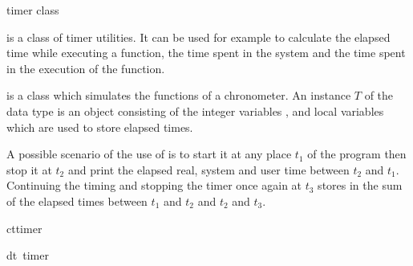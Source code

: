 

\NAME

 \dotfill timer class



\ABSTRACT

 is a class of timer utilities.  It can be used for
example to calculate the elapsed time while executing a function, the
time spent in the system and the time spent in the execution of the
function.


\DESCRIPTION

 is a class which simulates the functions of a
chronometer.  An instance $T$ of the data type  is an
object consisting of the integer variables ,
 and local variables which are used to store elapsed times.

A possible scenario of the use of  is to start it at any
place $t_1$ of the program then stop it at $t_2$ and print the elapsed
real, system and user time between $t_2$ and $t_1$.  Continuing the
timing and stopping the timer once again at $t_3$ stores in 
the sum of the elapsed times between $t_1$ and $t_2$ and $t_2$ and
$t_3$.



\CONS

\begin{fcode}{ct}{timer}{}
\end{fcode}

\begin{fcode}{dt}{~timer}{}
\end{fcode}



\INIT

